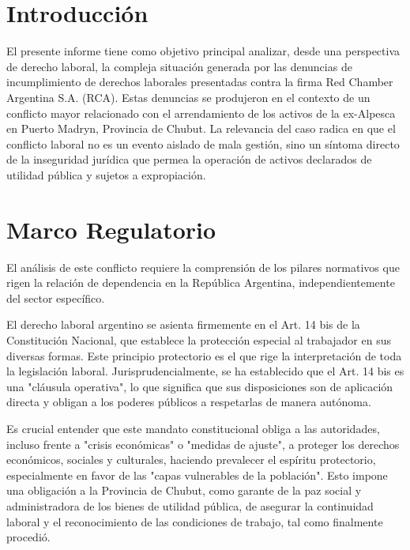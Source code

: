 \documentclass[]{informeutn}
\begin{document}
\maketitle


\chapter{Introducción}
  El presente informe tiene como objetivo principal analizar, desde una perspectiva de derecho laboral, la compleja
  situación generada por las denuncias de incumplimiento de derechos laborales presentadas contra la firma Red Chamber
  Argentina S.A. (RCA). Estas denuncias se produjeron en el contexto de un conflicto mayor relacionado con el
  arrendamiento de los activos de la ex-Alpesca en Puerto Madryn, Provincia de Chubut. La relevancia del caso radica en
  que el conflicto laboral no es un evento aislado de mala gestión, sino un síntoma directo de la inseguridad jurídica
  que permea la operación de activos declarados de utilidad pública y sujetos a expropiación.

\chapter{Marco Regulatorio}
  El análisis de este conflicto requiere la comprensión de los pilares normativos que rigen la relación de dependencia
  en la República Argentina, independientemente del sector específico.

  El derecho laboral argentino se asienta firmemente en el Art. 14 bis de la Constitución Nacional, que establece la
  protección especial al trabajador en sus diversas formas. Este principio protectorio es el que rige la interpretación
  de toda la legislación laboral. Jurisprudencialmente, se ha establecido que el Art. 14 bis es una "cláusula
  operativa", lo que significa que sus disposiciones son de aplicación directa y obligan a los poderes públicos a
  respetarlas de manera autónoma.

  Es crucial entender que este mandato constitucional obliga a las autoridades, incluso frente a "crisis económicas" o
  "medidas de ajuste", a proteger los derechos económicos, sociales y culturales, haciendo prevalecer el espíritu
  protectorio, especialmente en favor de las "capas vulnerables de la población". Esto impone una obligación a la
  Provincia de Chubut, como garante de la paz social y administradora de los bienes de utilidad pública, de asegurar la
  continuidad laboral y el reconocimiento de las condiciones de trabajo, tal como finalmente procedió.
\end{document}
